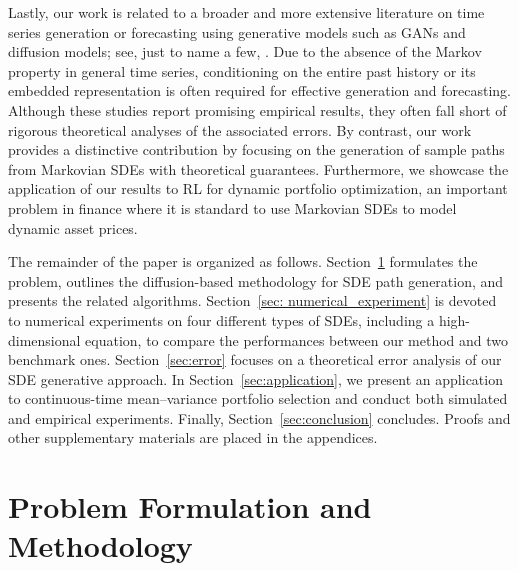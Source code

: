 \documentclass[11pt]{article}
\begin{document}
Lastly, our work is related to a broader and more extensive literature on time series generation or forecasting using generative models such as GANs and diffusion models; see, just to name a few,  \cite{narasimhan2024time, liao2024sig, wiese2020quant, yoon2019time}. Due to the absence of the Markov property in general time series, conditioning on the entire past history or its embedded representation is often required for effective generation and forecasting. Although these studies report promising empirical results, they often fall short of rigorous theoretical analyses of the associated errors. By contrast, our work provides a distinctive contribution by focusing on the generation of sample paths from Markovian SDEs with theoretical guarantees. Furthermore, we showcase the application of our results to RL for dynamic portfolio optimization, an important problem in finance where it is standard to use Markovian SDEs to model dynamic asset prices.



The remainder of the paper is organized as follows. Section~\ref{eq:problem} formulates the problem, outlines the diffusion-based methodology for SDE path generation, and presents the related algorithms. Section~\ref{sec: numerical_experiment} is devoted to numerical experiments on four different types of SDEs, including a high-dimensional equation, to compare the performances between our method and two benchmark ones.  Section~\ref{sec:error} focuses on a theoretical error analysis of our SDE generative approach. In Section~\ref{sec:application}, we present an application to continuous-time mean--variance portfolio selection and conduct both simulated and empirical experiments. Finally, Section~\ref{sec:conclusion} concludes. Proofs and other supplementary materials are placed in the appendices.







\section{Problem Formulation and Methodology}\label{eq:problem}
\end{document}
